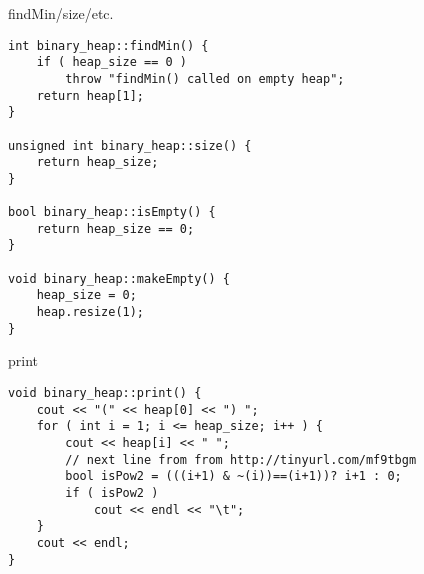 \begin{frame}[fragile,label=heapMinEtc]{findMin/size/etc.}
\lstset{language=C++,style=small}
\begin{lstlisting}
int binary_heap::findMin() {
    if ( heap_size == 0 )
        throw "findMin() called on empty heap";
    return heap[1];
}

unsigned int binary_heap::size() {
    return heap_size;
}

bool binary_heap::isEmpty() {
    return heap_size == 0;
}

void binary_heap::makeEmpty() {
    heap_size = 0;
    heap.resize(1);
}
\end{lstlisting}
\end{frame}

\begin{frame}[fragile,label=heapPrint]{print}
\lstset{language=C++,style=small}
\begin{lstlisting}
void binary_heap::print() {
    cout << "(" << heap[0] << ") ";
    for ( int i = 1; i <= heap_size; i++ ) {
        cout << heap[i] << " ";
        // next line from from http://tinyurl.com/mf9tbgm
        bool isPow2 = (((i+1) & ~(i))==(i+1))? i+1 : 0;
        if ( isPow2 )
            cout << endl << "\t";
    }
    cout << endl;
}
\end{lstlisting}
\end{frame}
